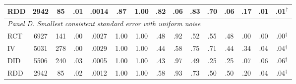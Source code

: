 \begin{table}[htbp]
{\begin{tabular}{lcccccccccccccc}
RDD & 2942 & 85 & .01 & .0014 & .87 & 1.00 & .82 & .06 & .83 & .70 & .06 & .17 & .01 & .01$^{\dagger}$ \\
\midrule
\multicolumn{15}{l}{\textit{Panel D. Smallest consistent standard error with uniform noise}} \\
RCT & 6927 & 141 & .00 & .0027 & 1.00 & 1.00 & .48 & .92 & .52 & .55 & .48 & .00 & .00 & .00$^{\dagger}$ \\
IV & 5031 & 278 & .00 & .0029 & 1.00 & 1.00 & .44 & .58 & .75 & .71 & .44 & .34 & .04 & .04$^{\dagger}$ \\
DID & 5506 & 240 & .03 & .0005 & 1.00 & 1.00 & .43 & .97 & .49 & .25 & .25 & .07 & .06 & .06$^{\dagger}$ \\
RDD & 2942 & 85 & .02 & .0012 & 1.00 & 1.00 & .58 & .93 & .73 & .50 & .50 & .20 & .04 & .04$^{\dagger}$ \\
\bottomrule
\end{tabular}}


\end{table}
